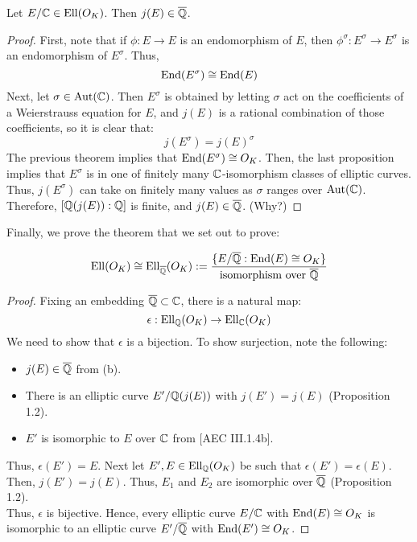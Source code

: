 \documentclass[12pt]{article}
\begin{document}
\begin{lemma}
    Let $E/\mathbb C \in \operatorname{Ell}(O_K)$. Then $j(E) \in \overline{\mathbb Q}$. 
\end{lemma}
\begin{proof}
    First, note that if $\phi: E \to E$ is an endomorphism of $E$, then $\phi^\sigma: E^\sigma \to E^\sigma$ is an endomorphism of $E^\sigma$. Thus, \[ \operatorname{End}(E^\sigma) \cong \operatorname{End}(E)\] 
    Next, let $\sigma \in \operatorname{Aut}(\mathbb C)$. Then $E^\sigma$ is obtained by letting $\sigma$ act on the coefficients of a Weierstrauss equation for $E$, and $j(E)$ is a rational combination of those coefficients, so it is clear that: 
    \[ j(E^\sigma) = j(E)^\sigma\]
    The previous theorem implies that $\operatorname{End}(E^\sigma) \cong O_K$. Then, the last proposition implies that $E^\sigma$ is in one of finitely many $\mathbb C$-isomorphism classes of elliptic curves. Thus, $j(E^\sigma)$ can take on finitely many values as $\sigma$ ranges over $\operatorname{Aut}(\mathbb C)$. Therefore, $[\mathbb Q(j(E)):\mathbb Q]$ is finite, and $j(E) \in \overline{\mathbb Q}$. (Why?)
\end{proof}

Finally, we prove the theorem that we set out to prove:

\begin{theorem}
    \[\operatorname{Ell}(O_K) \cong \operatorname{Ell}_{\overline{\mathbb Q}}(O_K) := \frac{\{E/\overline{\mathbb Q} : \operatorname{End}(E) \cong O_K\}}{\text{isomorphism over $\overline{\mathbb Q}$}}\]
\end{theorem}

\begin{proof}
    Fixing an embedding $\overline{\mathbb Q} \subset \mathbb C$, there is a natural map: 
    \[ \epsilon : \operatorname{Ell}_\mathbb Q(O_K) \to \operatorname{Ell}_\mathbb C(O_K)\]
    We need to show that $\epsilon$ is a bijection. \bbni
    To show surjection, note the following: 
    \begin{itemize}
        \item $j(E) \in \overline{\mathbb Q}$ from (b). 
        \item There is an elliptic curve $E'/\mathbb Q(j(E))$ with $j(E') = j(E)$ (Proposition 1.2).
        \item $E'$ is isomorphic to $E$ over $\mathbb C$ from [AEC III.1.4b].
    \end{itemize}
    Thus, $\epsilon(E') = E$. \bbni
    Next let $E', E \in \operatorname{Ell}_\mathbb Q(O_K)$ be such that $\epsilon(E') = \epsilon(E)$. Then, $j(E') = j(E)$. Thus, $E_1$ and $E_2$ are isomorphic over $\overline{\mathbb Q}$ (Proposition 1.2). \\
    Thus, $\epsilon$ is bijective. Hence, every elliptic curve $E/\mathbb C$ with $\operatorname{End}(E) \cong O_K$ is isomorphic to an elliptic curve $E'/\overline{\mathbb Q}$ with $\operatorname{End}(E') \cong O_K$.
\end{proof}
\end{document}
